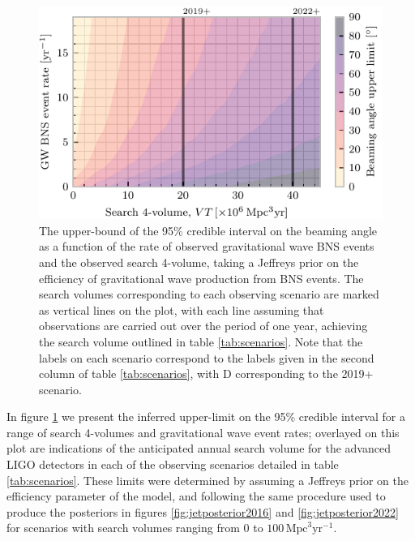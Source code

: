 \documentclass[twocolumn,nofootinbib]{revtex4-1}
\newcommand{\mpc}{\mathrm{Mpc}}
\newcommand{\yr}{\mathrm{yr}}
\begin{document}
\begin{figure}
\centering
\includegraphics[width=\linewidth]{volume_v_nevents.pdf}
\caption{\label{fig:volumevevents} The upper-bound of the 95\%
  credible interval on the beaming angle as a function of the rate of
  observed gravitational wave BNS events and the observed search
  4-volume, taking a Jeffreys prior on the efficiency of gravitational
  wave production from BNS events. The search volumes corresponding to
  each observing scenario are marked as vertical lines on the plot,
  with each line assuming that observations are carried out over the
  period of one year, achieving the search volume outlined in table
  \ref{tab:scenarios}. Note that the labels on each scenario
  correspond to the labels given in the second column of table
  \ref{tab:scenarios}, with D corresponding to the 2019+ scenario.}
\end{figure}

In figure \ref{fig:volumevevents} we present the inferred upper-limit
on the 95\% credible interval for a range of search 4-volumes and
gravitational wave event rates; overlayed on this plot are indications
of the anticipated annual search volume for the advanced LIGO
detectors in each of the observing scenarios detailed in table
\ref{tab:scenarios}. These limits were determined by assuming a
Jeffreys prior on the efficiency parameter of the model, and following
the same procedure used to produce the posteriors in figures
\ref{fig:jetposterior2016} and \ref{fig:jetposterior2022} for scenarios with
search volumes ranging from $0$ to $100\, \mpc^3 \yr^{-1}$. 
\end{document}
